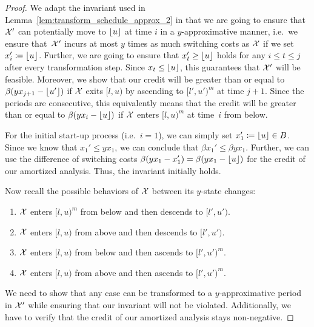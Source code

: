 \begin{proof}
We adapt the invariant used in Lemma~\ref{lem:transform_schedule_approx_2} in that we are going to ensure that $\mathcal{X}'$ can potentially move to $\lfloor u\rfloor$ at time $i$ in a $y$-approximative manner, i.e.\ we ensure that~$\mathcal{X}'$ incurs at most $y$ times as much switching costs as $\mathcal{X}$ if we set $x_i'\coloneqq \lfloor u\rfloor$. Further, we are going to ensure that $x_t'\ge \lfloor u\rfloor$ holds for any $i\le t\le j$ after every transformation step. Since $x_t\le \lfloor u\rfloor$, this guarantees that $\mathcal{X}'$ will be feasible.
Moreover, we show that our credit will be greater than or equal to $\beta(yx_{j+1}-\lfloor u'\rfloor)$ if $\mathcal{X}$ exits $[l,u)$ by ascending to $[l',u')^m$ at time $j+1$. Since the periods are consecutive, this equivalently means that the credit will be greater than or equal to $\beta(yx_i-\lfloor u\rfloor)$ if $\mathcal{X}$ enters $[l,u)^m$ at time~$i$ from below.

For the initial start-up process (i.e.\ $i=1$), we can simply set $x_1'\coloneqq \lfloor u\rfloor \in B$. Since we know that $x_1'\le yx_1$, we can conclude that $\beta x_1'\le\beta yx_1$. Further, we can use the difference of switching costs $\beta(yx_1-x_1')=\beta(yx_1-\lfloor u\rfloor)$ for the credit of our amortized analysis. Thus, the invariant initially holds.

Now recall the possible behaviors of $\mathcal{X}$ between its $y$-state changes:
\begin{enumerate}[label=(\alph*)]
	\item $\mathcal{X}$ enters $[l,u)^m$ from below and then descends to $[l',u')$.\label{itm:schedule_behavior_up_down_y}
	\item $\mathcal{X}$ enters $[l,u)$ from above and then descends to $[l',u')$.\label{itm:schedule_behavior_down_down_y}
	\item $\mathcal{X}$ enters $[l,u)$ from below and then ascends to $[l',u')^m$.\label{itm:schedule_behavior_up_up_y} 
	\item $\mathcal{X}$ enters $[l,u)$ from above and then ascends to $[l',u')^m$.\label{itm:schedule_behavior_down_up_y} 
\end{enumerate}
We need to show that any case can be transformed to a $y$-approximative period in $\mathcal{X}'$ while ensuring that our invariant will not be violated. Additionally, we have to verify that the credit of our amortized analysis stays non-negative.


\end{proof}
